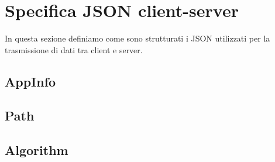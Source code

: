 \section{Specifica JSON client-server}
\label{sec:Specifica JSON client-server}

In questa sezione definiamo come sono strutturati i JSON utilizzati per la trasmissione di dati tra client e server.

\subsection{AppInfo}
\label{sub:AppInfo}



\subsection{Path}
\label{sub:Path}




\subsection{Algorithm}
\label{sub:Algorithm}

\subsection{}
